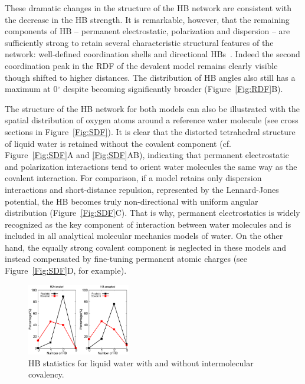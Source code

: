 \documentclass[aps,prl,reprint,amsmath,amssymb]{revtex4-1}
\begin{document}
These dramatic changes in the structure of the HB network are consistent with the decrease in the HB strength. 
It is remarkable, however, that the remaining components of HB -- permanent electrostatic, polarization and dispersion -- are sufficiently strong to retain several characteristic structural features of the network: well-defined coordination shells and directional HBs~\cite{arunan2011definition}.
Indeed the second coordination peak in the RDF of the devalent model remains clearly visible though shifted to higher distances. 
The distribution of HB angles also still has a maximum at 0$^\circ$ despite becoming significantly broader (Figure~\ref{Fig:RDF}B).

The structure of the HB network for both models can also be illustrated with the spatial distribution of oxygen atoms around a reference water molecule (see cross sections in Figure~\ref{Fig:SDF}). 
It is clear that the distorted tetrahedral structure of liquid water is retained without the covalent component (cf. Figure~\ref{Fig:SDF}A and \ref{Fig:SDF}AB), indicating that permanent electrostatic and polarization interactions tend to orient water molecules the same way as the covalent interaction. 
For comparison, if a model retains only dispersion interactions and short-distance repulsion, represented by the Lennard-Jones potential, the HB becomes truly non-directional with uniform angular distribution (Figure~\ref{Fig:SDF}C). 
That is why, permanent electrostatics is widely recognized as the key component of interaction between water molecules and is included in all analytical molecular mechanics models of water. 
On the other hand, the equally strong covalent component is neglected in these models and instead compensated by fine-tuning permanent atomic charges (see Figure~\ref{Fig:SDF}D, for example). 

\begin{figure}
\includegraphics[width=0.4\textwidth]{new_hbstat}
\caption{HB statistics for liquid water with and without intermolecular covalency.}\label{fig:HBstat}
\end{figure}
\end{document}
